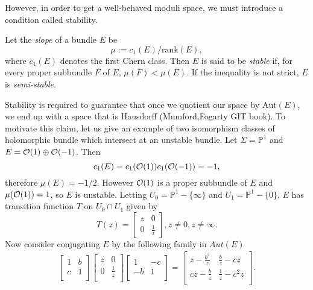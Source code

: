 	However, in order to get a well-behaved moduli space, we must introduce a condition called stability. 
	\begin{definition}
		Let the \emph{slope} of a bundle $E$ be
		$$\mu := c_1(E)/\text{rank}(E),$$
		where $c_1(E)$ denotes the first Chern class. Then $E$ is said to be \textit{stable} if, for every proper subbundle $F$ of $E$, $\mu(F) < \mu(E)$. If the inequality is not strict, $E$ is \textit{semi-stable}.
	\end{definition}
	Stability is required to guarantee that once we quotient our space by $\text{Aut}(E)$, we end up with a space that is Hausdorff (Mumford,Fogarty GIT book). To motivate this claim, let us give an example of two isomorphism classes of holomorphic bundle which intersect at an unstable bundle. Let $\Sigma = \mathbb{P}^1$ and $E = \mathcal{O}(1)\oplus \mathcal{O}(-1)$. Then
	\begin{equation}
		c_1(E) = c_1(\mathcal{O}(1))c_1(\mathcal{O}(-1)) = -1,
	\end{equation} 
	therefore $\mu(E) = -1/2$. However $\mathcal{O}(1)$ is a proper subbundle of $E$ and $\mu(\mathcal{O}(1)) = 1$, so $E$ is unstable. Letting $U_0 = \mathbb{P}^1 - \{\infty\}$ and $U_1 = \mathbb{P}^1 - \{0\}$, $E$ has transition function $T$ on $U_0 \cap U_1$ given by
	\begin{equation*}
	T(z) = \begin{bmatrix}
	z & 0\\
	0 & \frac{1}{z}
	\end{bmatrix}, z \neq 0, z\neq \infty.
	\end{equation*}
	Now consider conjugating $E$ by the following family in $Aut(E)$
	\begin{align*}
		\begin{bmatrix}
		1 & b\\
		c & 1\\
		\end{bmatrix}
		\begin{bmatrix}
		z & 0\\
		0 & \frac{1}{z}\\
		\end{bmatrix}
		\begin{bmatrix}
		1 & -c\\
		-b & 1\\
		\end{bmatrix} = \begin{bmatrix}
		z - \frac{b^2}{z} & \frac{b}{z}-cz\\
		cz - \frac{b}{z} & \frac{1}{z}-c^2 z\\
		\end{bmatrix}.
	\end{align*}
